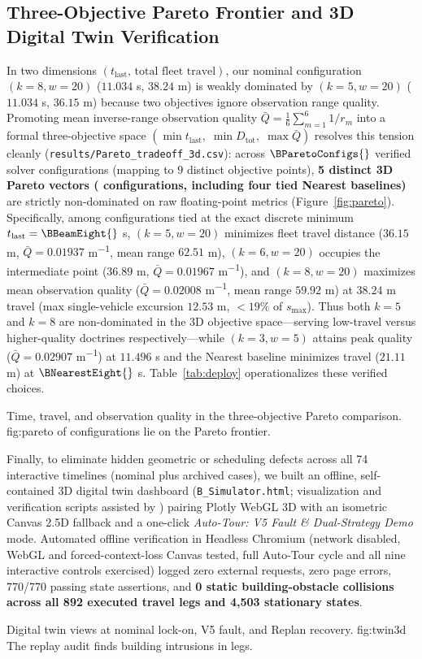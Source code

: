 \subsection{Three-Objective Pareto Frontier and 3D Digital Twin Verification}
In two dimensions $(t_{\mathrm{last}},\,\text{total fleet travel})$, our nominal configuration $(k=8,w=20)$ ($11.034$ s, $38.24$ m) is weakly dominated by $(k=5,w=20)$ ($11.034$ s, $36.15$ m) because two objectives ignore observation range quality. Promoting mean inverse-range observation quality $\bar{Q}=\frac{1}{6}\sum_{m=1}^{6} 1/r_m$ into a formal three-objective space $(\min t_{\mathrm{last}},\;\min D_{\mathrm{tot}},\;\max \bar{Q})$ resolves this tension cleanly (\texttt{results/Pareto\_tradeoff\_3d.csv}): across $\BParetoConfigs{}$ verified solver configurations (mapping to $9$ distinct objective points), \textbf{5 distinct 3D Pareto vectors (\BParetoFrontCount{} configurations, including four tied Nearest baselines)} are strictly non-dominated on raw floating-point metrics (Figure~\ref{fig:pareto}). Specifically, among configurations tied at the exact discrete minimum $t_{\mathrm{last}}=\BBeamEight{}$ s, $(k=5,w=20)$ minimizes fleet travel distance ($36.15$ m, $\bar{Q}=0.01937$ m\textsuperscript{$-1$}, mean range $62.51$ m), $(k=6,w=20)$ occupies the intermediate point ($36.89$ m, $\bar{Q}=0.01967$ m\textsuperscript{$-1$}), and $(k=8,w=20)$ maximizes mean observation quality ($\bar{Q}=0.02008$ m\textsuperscript{$-1$}, mean range $59.92$ m) at $38.24$ m travel (max single-vehicle excursion $12.53$ m, $<19\%$ of $s_{\max}$). Thus both $k=5$ and $k=8$ are non-dominated in the 3D objective space—serving low-travel versus higher-quality doctrines respectively—while $(k=3,w=5)$ attains peak quality ($\bar{Q}=0.02907$ m\textsuperscript{$-1$}) at $11.496$ s and the Nearest baseline minimizes travel ($21.11$ m) at $\BNearestEight{}$ s. Table~\ref{tab:deploy} operationalizes these verified choices.

{Time, travel, and observation quality in the three-objective Pareto comparison.}
{fig:pareto}
{\BParetoFrontCount{} of \BParetoConfigs{} configurations lie on the Pareto frontier.}

Finally, to eliminate hidden geometric or scheduling defects across all 74 interactive timelines (nominal plus \BCaseCount{} archived cases), we built an offline, self-contained 3D digital twin dashboard (\texttt{B\_Simulator.html}; visualization and verification scripts assisted by \cite{archivedai,antigravityai}) pairing Plotly WebGL 3D with an isometric Canvas 2.5D fallback and a one-click \emph{Auto-Tour: V5 Fault \& Dual-Strategy Demo} mode. Automated offline verification in Headless Chromium (network disabled, WebGL and forced-context-loss Canvas tested, full Auto-Tour cycle and all nine interactive controls exercised) logged zero external requests, zero page errors, 770/770 passing state assertions, and \textbf{0 static building-obstacle collisions across all 892 executed travel legs and 4,503 stationary states}.

{Digital twin views at nominal lock-on, V5 fault, and Replan recovery.}
{fig:twin3d}
{The replay audit finds \BStaticIntrusions{} building intrusions in \BStaticSegments{} legs.}

